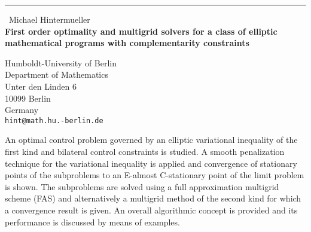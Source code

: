 \documentclass{report}
\begin{document}
\begin{center}
\rule{6in}{1pt} \
{\large Michael Hintermueller \\
{\bf First order optimality and multigrid solvers for a class of elliptic mathematical programs with complementarity constraints}}

Humboldt-University of Berlin \\ Department of Mathematics \\ Unter den Linden 6 \\ 10099 Berlin \\ Germany
\\
{\tt hint@math.hu.-berlin.de}\end{center}

An optimal control problem governed by an elliptic variational inequality
of the first kind and bilateral control constraints is studied. A smooth
penalization technique for the variational inequality is applied and
convergence of stationary
points of the subproblems to an E-almost C-stationary point of the limit
problem is shown. The subproblems are solved using a full approximation
multigrid scheme (FAS) and alternatively a multigrid method of the second
kind for which a convergence result is given. An overall algorithmic
concept is provided and its performance
is discussed by means of examples.
\end{document}
